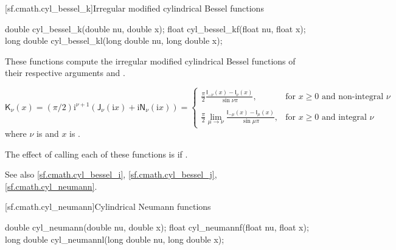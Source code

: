 [sf.cmath.cyl_bessel_k]{Irregular modified cylindrical Bessel functions}%
%
%
%
%
%
\begin{itemdecl}
double       cyl_bessel_k(double nu, double x);
float        cyl_bessel_kf(float nu, float x);
long double  cyl_bessel_kl(long double nu, long double x);
\end{itemdecl}

\begin{itemdescr}

\pnum\effects
These functions compute
the irregular modified cylindrical Bessel functions
of their respective arguments
 and .

\pnum\returns
\[%
  \mathsf{K}_\nu(x) =
  (\pi/2)\mathrm{i}^{\nu+1} (            \mathsf{J}_\nu(\mathrm{i}x)
			    + \mathrm{i} \mathsf{N}_\nu(\mathrm{i}x)
			    )
  =
  \left\{
  \begin{array}{cl}
  \displaystyle
  \frac{\pi}{2}
  \frac{\mathsf{I}_{-\nu}(x) - \mathsf{I}_{\nu}(x)}
       {\sin \nu\pi },
  & \mbox{for $x \ge 0$ and non-integral $\nu$}
  \\
  \\
  \displaystyle
  \frac{\pi}{2}
  \lim_{\mu \rightarrow \nu} \frac{\mathsf{I}_{-\mu}(x) - \mathsf{I}_{\mu}(x)}
                                  {\sin \mu\pi },
  & \mbox{for $x \ge 0$ and integral $\nu$}
  \end{array}
  \right.
\]
where
$\nu$ is  and
$x$ is .

\pnum\remarks
The effect of calling each of these functions
is 
if .

\pnum See also \ref{sf.cmath.cyl_bessel_i}, \ref{sf.cmath.cyl_bessel_j}, \ref{sf.cmath.cyl_neumann}.
\end{itemdescr}

[sf.cmath.cyl_neumann]{Cylindrical Neumann functions}%
%
%
%
%
%
%
\begin{itemdecl}
double       cyl_neumann(double nu, double x);
float        cyl_neumannf(float nu, float x);
long double  cyl_neumannl(long double nu, long double x);
\end{itemdecl}

